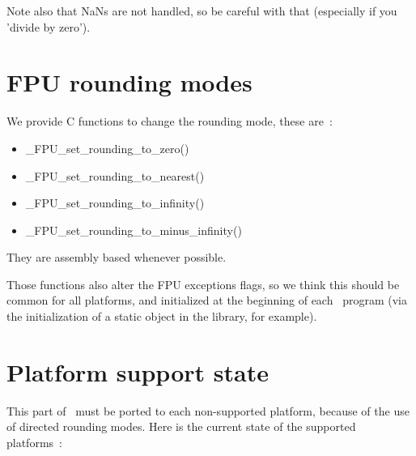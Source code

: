 \documentclass{book}
\begin{document}
\smallskip

Note also that NaNs are not handled, so be careful with that
(especially if you 'divide by zero').


\section{FPU rounding modes}

We provide C functions to change the rounding mode, these are~:
\begin{itemize}
\item \_FPU\_set\_rounding\_to\_zero()
\item \_FPU\_set\_rounding\_to\_nearest()
\item \_FPU\_set\_rounding\_to\_infinity()
\item \_FPU\_set\_rounding\_to\_minus\_infinity()
\end{itemize}

They are assembly based whenever possible.

Those functions also alter the FPU exceptions flags, so we think this should
be common for all platforms, and initialized at the beginning of each \cgal\
program (via the initialization of a static object in the library, for example).

\section{Platform support state}

This part of \cgal\ must be ported to each non-supported platform, because of
the use of directed rounding modes.  Here is the current state of the
supported platforms~:
\end{document}
